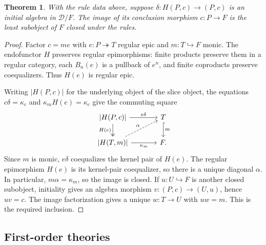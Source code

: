\documentclass[11pt]{article}
\newtheorem{theorem}{Theorem}[section]
\theoremstyle{definition}\newtheorem{definition}[theorem]{Definition}
\begin{document}
\begin{theorem}\label{thm:least-theorem-subobject}
With the rule data above, suppose
$\delta:H(P,c)\to(P,c)$ is an initial algebra in $\mathcal D/F$.
The image of its conclusion morphism $c:P\to F$ is the least
subobject of $F$ closed under the rules.
\end{theorem}
\begin{proof}
Factor $c=me$ with $e:P\twoheadrightarrow T$ regular epic and
$m:T\hookrightarrow F$ monic. The endofunctor $H$ preserves
regular epimorphisms: finite products preserve them in a regular
category, each $B_n(e)$ is a pullback of $e^n$, and finite coproducts
preserve coequalizers. Thus $H(e)$ is regular epic.

Writing $|H(P,c)|$ for the underlying object of the slice object,
the equations $c\delta=\kappa_c$ and
$\kappa_mH(e)=\kappa_c$ give the commuting square
\[
\begin{tikzcd}[column sep=large]
 \lvert H(P,c)\rvert\arrow[r,"e\delta"]\arrow[d,two heads,"H(e)"'] &
 T\arrow[d,hook,"m"]\\
 \lvert H(T,m)\rvert\arrow[r,"\kappa_m"']\arrow[ur,dashed,"\alpha"] & F.
\end{tikzcd}
\]
Since $m$ is monic, $e\delta$ coequalizes the kernel pair of $H(e)$.
The regular epimorphism $H(e)$ is its kernel-pair coequalizer, so
there is a unique diagonal $\alpha$. In particular, $m\alpha=\kappa_m$,
so the image is closed. If $u:U\hookrightarrow F$ is another
closed subobject, initiality gives an algebra morphism
$v:(P,c)\to(U,u)$, hence $uv=c$. The image factorization gives
a unique $w:T\to U$ with $uw=m$. This is the required inclusion.
\end{proof}

\subsection{First-order theories}
\label{app:first-order-derivations}
\end{document}
